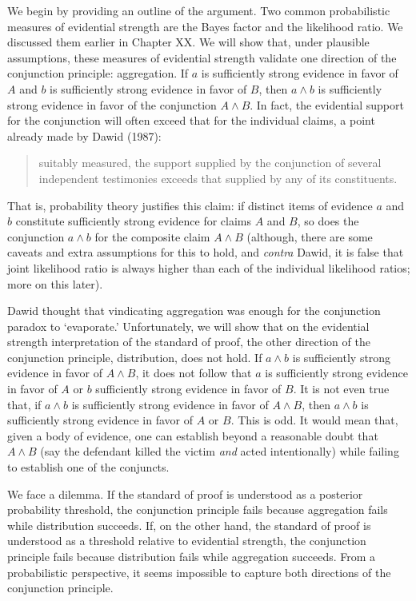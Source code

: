 \documentclass[
  10pt,
  dvipsnames,enabledeprecatedfontcommands]{scrartcl}
\begin{document}
We begin by providing an outline of the argument. Two common
probabilistic measures of evidential strength are the Bayes factor and
the likelihood ratio. We discussed them earlier in Chapter XX.
 We will show that, under plausible
assumptions, these measures of evidential strength validate one
direction of the conjunction principle: aggregation. If \(a\) is
sufficiently strong evidence in favor of \(A\) and \(b\) is sufficiently
strong evidence in favor of \(B\), then \(a\wedge b\) is sufficiently
strong evidence in favor of the conjunction \(A \wedge B\). In fact, the
evidential support for the conjunction will often exceed that for the
individual claims, a point already made by Dawid (1987):

\begin{quote} suitably measured, the support supplied by the conjunction of several independent testimonies exceeds that supplied by any of its constituents.
 \end{quote}

\noindent That is, probability theory justifies this claim: if distinct
items of evidence \(a\) and \(b\) constitute sufficiently strong
evidence for claims \(A\) and \(B\), so does the conjunction
\(a\wedge b\) for the composite claim \(A\wedge B\) (although, there are
some caveats and extra assumptions for this to hold, and \emph{contra}
Dawid, it is false that joint likelihood ratio is always higher than
each of the individual likelihood ratios; more on this later).

Dawid thought that vindicating aggregation was enough for the
conjunction paradox to `evaporate.' Unfortunately, we will show that on
the evidential strength interpretation of the standard of proof, the
other direction of the conjunction principle, distribution, does not
hold. If \(a \wedge b\) is sufficiently strong evidence in favor of
\(A \wedge B\), it does not follow that \(a\) is sufficiently strong
evidence in favor of \(A\) or \(b\) sufficiently strong evidence in
favor of \(B\). It is not even true that, if \(a \wedge b\) is
sufficiently strong evidence in favor of \(A \wedge B\), then
\(a\wedge b\) is sufficiently strong evidence in favor of \(A\) or
\(B\). This is odd. It would mean that, given a body of evidence, one
can establish beyond a reasonable doubt that \(A \wedge B\) (say the
defendant killed the victim \textit{and} acted intentionally) while
failing to establish one of the conjuncts.

We face a dilemma. If the standard of proof is understood as a posterior
probability threshold, the conjunction principle fails because
aggregation fails while distribution succeeds. If, on the other hand,
the standard of proof is understood as a threshold relative to
evidential strength, the conjunction principle fails because
distribution fails while aggregation succeeds. From a probabilistic
perspective, it seems impossible to capture both directions of the
conjunction principle.
\end{document}
